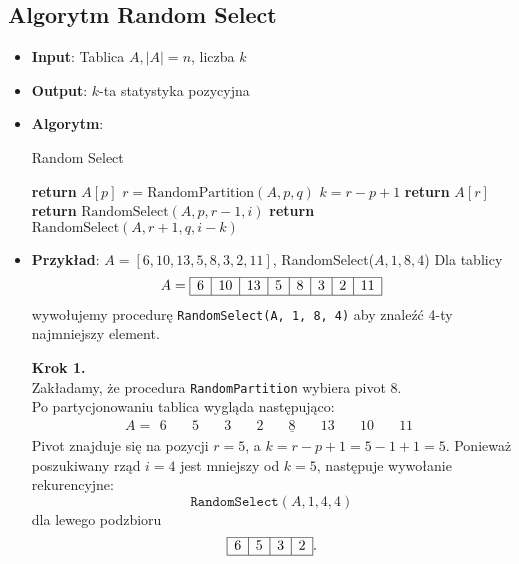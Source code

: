 \documentclass[11pt,a4paper]{article}
\begin{document}
\subsection{Algorytm Random Select}
\begin{itemize}
    \item \textbf{Input}: Tablica $A, |A|=n$, liczba $k$
    \item \textbf{Output}: $k$-ta statystyka pozycyjna
    \item \textbf{Algorytm}:
        \begin{algorithm}
            \caption{Random Select}
            \begin{algorithmic}[1]
                    \State \textbf{return} $A[p]$
                \EndIf
                \State $r = \text{RandomPartition}(A,p,q)$ 
                \State $k = r-p+1$
                \State \textbf{return} $A[r]$ 
                \State \textbf{return} $\text{RandomSelect}(A,p,r-1,i)$
                \Else
                \State \textbf{return} $\text{RandomSelect}(A,r+1,q,i-k)$
                \EndIf
                \EndProcedure
            \end{algorithmic}
        \end{algorithm}
    \item \textbf{Przykład}: $A = [6,10,13,5,8,3,2,11]$, RandomSelect($A,1,8,4$)
        Dla tablicy
        \[
            A = \begin{array}{|c|c|c|c|c|c|c|c|}
                \hline
                6 & 10 & 13 & 5 & 8 & 3 & 2 & 11 \\ \hline
            \end{array}
        \]
        wywołujemy procedurę \texttt{RandomSelect(A, 1, 8, 4)} aby znaleźć 4-ty najmniejszy element.

        \bigskip

        \textbf{Krok 1.}\\
        Zakładamy, że procedura \texttt{RandomPartition} wybiera pivot $8$.\\
        Po partycjonowaniu tablica wygląda następująco:
        \[
            A = \begin{array}{cccccccc}
                6 \quad & 5 \quad & 3 \quad & 2 \quad & \underline{8} \quad & 13 \quad & 10 \quad & 11
            \end{array}
        \]
        Pivot znajduje się na pozycji $r=5$, a $k = r - p + 1 = 5 - 1 + 1 = 5$. Ponieważ poszukiwany rząd $i=4$ jest mniejszy od $k=5$, następuje wywołanie rekurencyjne:
        \[
            \texttt{RandomSelect}(A,1,4,4)
        \]
        dla lewego podzbioru
        \[
            \begin{array}{|c|c|c|c|}
                \hline
                6 & 5 & 3 & 2 \\ \hline
            \end{array}.
        \]


\end{itemize}
\end{document}
